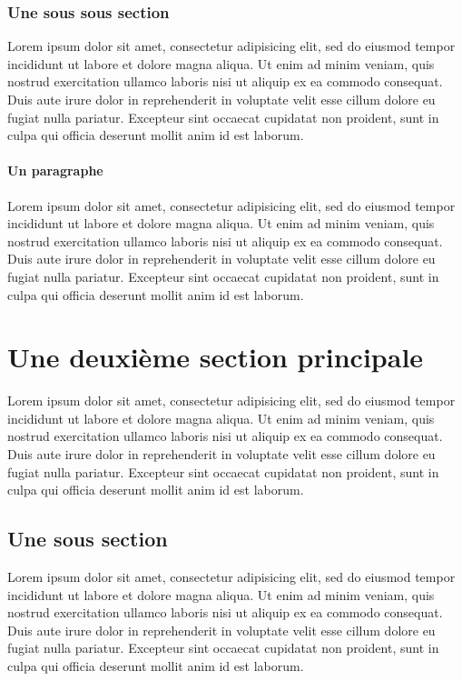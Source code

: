 \subsubsection{Une sous sous section}
Lorem ipsum dolor sit amet, consectetur adipisicing elit, sed do eiusmod
tempor incididunt ut labore et dolore magna aliqua. Ut enim ad minim veniam,
quis nostrud exercitation ullamco laboris nisi ut aliquip ex ea commodo
consequat. Duis aute irure dolor in reprehenderit in voluptate velit esse
cillum dolore eu fugiat nulla pariatur. Excepteur sint occaecat cupidatat non
proident, sunt in culpa qui officia deserunt mollit anim id est laborum.

\paragraph{Un paragraphe}
Lorem ipsum dolor sit amet, consectetur adipisicing elit, sed do eiusmod
tempor incididunt ut labore et dolore magna aliqua. Ut enim ad minim veniam,
quis nostrud exercitation ullamco laboris nisi ut aliquip ex ea commodo
consequat. Duis aute irure dolor in reprehenderit in voluptate velit esse
cillum dolore eu fugiat nulla pariatur. Excepteur sint occaecat cupidatat non
proident, sunt in culpa qui officia deserunt mollit anim id est laborum.

\section{Une deuxième section principale}
Lorem ipsum dolor sit amet, consectetur adipisicing elit, sed do eiusmod
tempor incididunt ut labore et dolore magna aliqua. Ut enim ad minim veniam,
quis nostrud exercitation ullamco laboris nisi ut aliquip ex ea commodo
consequat. Duis aute irure dolor in reprehenderit in voluptate velit esse
cillum dolore eu fugiat nulla pariatur. Excepteur sint occaecat cupidatat non
proident, sunt in culpa qui officia deserunt mollit anim id est laborum.

\subsection{Une sous section}
Lorem ipsum dolor sit amet, consectetur adipisicing elit, sed do eiusmod
tempor incididunt ut labore et dolore magna aliqua. Ut enim ad minim veniam,
quis nostrud exercitation ullamco laboris nisi ut aliquip ex ea commodo
consequat. Duis aute irure dolor in reprehenderit in voluptate velit esse
cillum dolore eu fugiat nulla pariatur. Excepteur sint occaecat cupidatat non
proident, sunt in culpa qui officia deserunt mollit anim id est laborum.

